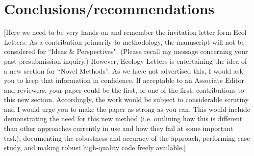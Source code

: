 \documentclass[12pt]{article}
\begin{document}
\section*{Conclusions/recommendations}

  [Here we need to be very hands-on and remember the invitation letter form Ecol Letters:
  As a contribution primarily to methodology, the manuscript will not be considered for ``Ideas \& Perspectives". (Please recall my message concerning your past presubmission inquiry.) However, Ecology Letters is entertaining the idea of a new section for ``Novel Methods". As we have not advertised this, I would ask you to keep that information in confidence. If acceptable to an Associate Editor and reviewers, your paper could be the first, or one of the first, contributions to this new section. Accordingly, the work would be subject to considerable scrutiny and I would urge you to make the paper as strong as you can. This would include demonstrating the need for this new method (i.e. outlining how this is different than other approaches currently in use and how they fail at some important task), documenting the robustness and accuracy of the approach, performing case study, and making robust high-quality code freely available.]



\clearpage

     
\end{document}
